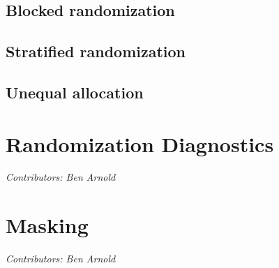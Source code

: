 \documentclass[
]{book}
\begin{document}
\hypertarget{blocked-randomization}{%
\section{Blocked randomization}\label{blocked-randomization}}

\hypertarget{stratified-randomization}{%
\section{Stratified randomization}\label{stratified-randomization}}

\hypertarget{unequal-allocation}{%
\section{Unequal allocation}\label{unequal-allocation}}

\hypertarget{diagnostics}{%
\chapter{Randomization Diagnostics}\label{diagnostics}}

\emph{Contributors: Ben Arnold}

\hypertarget{masking}{%
\chapter{Masking}\label{masking}}

\emph{Contributors: Ben Arnold}

  
\end{document}
